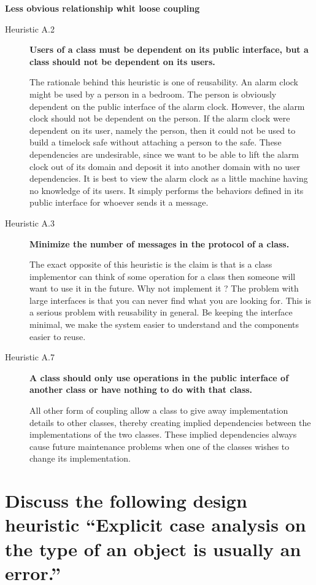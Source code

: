 \textbf{Less obvious relationship whit loose coupling}

\begin{description}
\item[Heuristic A.2] \textbf{Users of a class must be dependent on its public interface, but a class should not be dependent on its users.}

The rationale behind this heuristic is one of reusability. An alarm clock might be used by a person in a bedroom. The person is obviously dependent on the public interface of the alarm clock. However, the alarm clock should not be dependent on the person. If the alarm clock were dependent on its user, namely the person, then it could not be used to build a timelock safe without attaching a person to the safe. These dependencies are undesirable, since we want to be able to lift the alarm clock out of its domain and deposit it into another domain with no user dependencies. It is best to view the alarm clock as a little machine having no knowledge of its users. It simply performs the behaviors defined in its public interface for whoever sends it a message.

\item[Heuristic A.3] \textbf{Minimize the number of messages in the protocol of a class.}

The exact opposite of this heuristic is the claim is that is a class implementor can think of some operation for a class then someone will want to use it in the future.  Why not implement it ?
The problem with large interfaces is that you can never find what you are looking for. This is a serious problem with reusability in general. Be keeping the interface minimal, we make the system easier to understand and the components easier to reuse.

\item[Heuristic A.7] \textbf{A class should only use operations in the public interface of another class or have nothing to do with that class.}

All other form of coupling allow a class to give away implementation details to other classes, thereby creating implied dependencies between the implementations of the two classes. These implied dependencies always cause future maintenance problems when one of the classes wishes to change its implementation.


\end{description}


\section{Discuss the following design heuristic “Explicit case analysis on the type of an object is usually an error.”}

